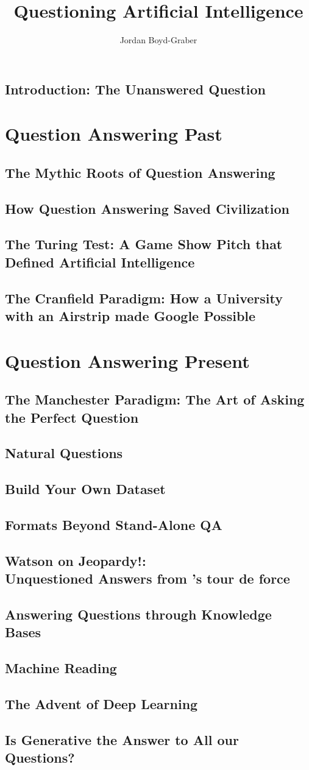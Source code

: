\documentclass[bfivepaper,twosided,justified,nobib]{style/tufte-book}
\title{Questioning Artificial Intelligence}
\author{Jordan Boyd-Graber}
\newif\ifproposal\proposalfalse
\newcommand{\proposalpart}[1]{
  \ifproposal
  \subsection{#1}
  \else
  \part{#1}
  \fi
}
\newcommand{\chapterfile}[3]{
  \ifproposal
    \stepcounter{chapter}
    \label{ch:#2}
  \paragraph{#3}
  
  \else
  \chapter{#3}
  \label{ch:#2}
  \begin{quote}
    
  \end{quote}
  
  \fi}
\begin{document}
\setcounter{secnumdepth}{1}

\ifproposal
  
\else

\tableofcontents

\fi








\chapterfile{010}{introduction}{Introduction: The Unanswered Question}

\ifproposal
  
    \chapter{Outline}
\else
  \clearpage
\fi




\proposalpart{Question Answering Past}

\chapterfile{110}{epic}{The Mythic Roots of Question Answering}

\chapterfile{120}{civilization}{How Question Answering Saved Civilization}





\chapterfile{130}{turing}{The Turing Test: A Game Show Pitch that
  Defined Artificial Intelligence}

\chapterfile{140}{ir}{The Cranfield Paradigm: How a University with an
  Airstrip made Google Possible}

\proposalpart{Question Answering Present}

\chapterfile{200}{manchester}{The Manchester Paradigm: The Art of Asking the
  Perfect Question}

\chapterfile{210}{datasets_natural}{Natural Questions}    

\chapterfile{220}{datasets_constructed}{Build Your Own Dataset}

\chapterfile{230}{formats}{Formats Beyond Stand-Alone QA}

\chapterfile{250}{watson}{Watson on Jeopardy!: \\ Unquestioned Answers from \abr{ibm}'s tour de force}

\chapterfile{270}{methods_kb}{Answering Questions through Knowledge
  Bases}



\chapterfile{271}{methods_mr}{Machine Reading}
\chapterfile{272}{methods_deep_retrieval}{The Advent of Deep Learning}
\chapterfile{273}{methods_generation}{Is Generative  the Answer to All
our Questions?}
\end{document}
